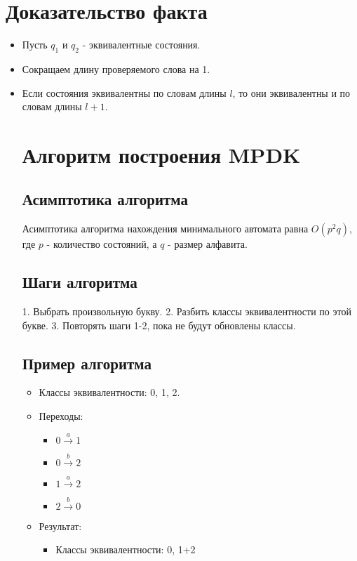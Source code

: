 \documentclass{article}
\begin{document}
\section{Доказательство факта}

\begin{itemize}
\item Пусть $q_1$ и $q_2$ - эквивалентные состояния.
\item Сокращаем длину проверяемого слова на 1.
\item Если состояния эквивалентны по словам длины $l$, то они эквивалентны и по словам длины $l+1$.
\section{Алгоритм построения MPDK}
\subsection{Асимптотика алгоритма}
Асимптотика алгоритма нахождения минимального автомата равна $O(p^2q)$, где $p$ - количество состояний, а $q$ - размер алфавита.

\subsection{Шаги алгоритма}
1. Выбрать произвольную букву.
2. Разбить классы эквивалентности по этой букве.
3. Повторять шаги 1-2, пока не будут обновлены классы.

\subsection{Пример алгоритма}
\begin{itemize}
  \item Классы эквивалентности: 0, 1, 2.
  \item Переходы:
    \begin{itemize}
      \item $0 \xrightarrow{a} 1$
      \item $0 \xrightarrow{b} 2$
      \item $1 \xrightarrow{a} 2$
      \item $2 \xrightarrow{b} 0$
    \end{itemize}
  \item Результат:
    \begin{itemize}
      \item Классы эквивалентности: 0, 1+2
    \end{itemize}
\end{itemize}


\end{itemize}
\end{document}

